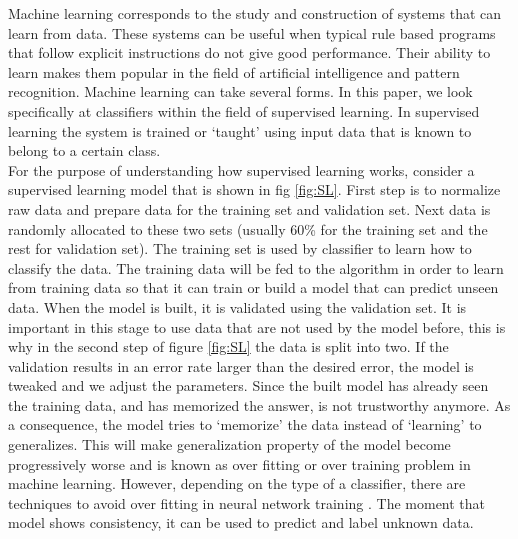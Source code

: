 Machine learning corresponds to the study and construction of systems that can learn from data. These systems can be useful when typical rule based programs that follow explicit instructions do not give good performance. Their ability to learn makes them popular in the field of artificial intelligence and pattern recognition. Machine learning can take several forms. In this paper, we look specifically at classifiers within the field of supervised learning. In supervised learning the system is trained or `taught' using input data that is known to belong to a certain class.\\ 

For the purpose of understanding how supervised learning works, consider a supervised learning model that is shown in fig \ref{fig:SL}. First step is to normalize raw data and prepare data for the training set and validation set. Next data is randomly allocated to these two sets (usually $60$\% for the training set and the rest for validation set). The training set is used by classifier to learn how to classify the data. The training data will be fed to the algorithm in order to learn from training data so that it can train or build a model that can predict unseen data. When the model is built, it is validated using the validation set. It is important in this stage to use data that are not used by the model before, this is why in the second step of figure \ref{fig:SL} the data is split into two. If the validation results in an error rate larger than the desired error, the model is tweaked and we adjust the parameters. Since the built model has already seen the training data, and has memorized the answer, is not trustworthy anymore. As a consequence, the model tries to `memorize' the data instead of `learning' to generalizes. This will make generalization property of the model become progressively worse and is known as over fitting or over training \cite{hawkins2004problem} problem in machine learning. However, depending on the type of a classifier, there are techniques to avoid over fitting in neural network training \cite{Piotrowski201397}. The moment that model shows consistency, it can be used to predict and label unknown data. \\  
 
